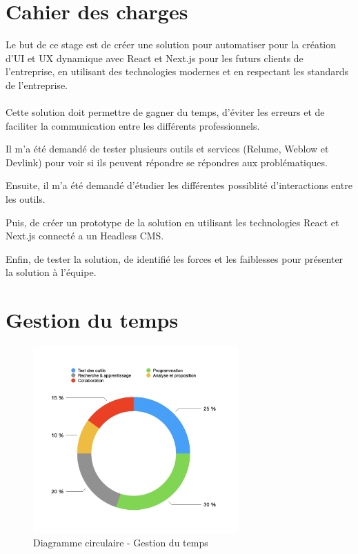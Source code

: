 \section{Cahier des charges}
Le but de ce stage est de créer une solution pour automatiser pour la création d'UI et UX dynamique avec React et Next.js pour les futurs clients de l'entreprise, en utilisant des technologies modernes et en respectant les standards de l'entreprise. 
\\ \\
Cette solution doit permettre de gagner du temps, d'éviter les erreurs et de faciliter la communication entre les différents professionnels.

Il m'a été demandé de tester plusieurs outils et services (Relume, Weblow et Devlink) pour voir si ils peuvent répondre se répondres aux problématiques.

Ensuite, il m'a été demandé d'étudier les différentes possiblité d'interactions entre les outils. 

Puis, de créer un prototype de la solution en utilisant les technologies React et Next.js connecté a un Headless CMS.

Enfin, de tester la solution, de identifié les forces et les faiblesses pour présenter la solution à l'équipe.

\section{Gestion du temps}

\begin{figure}[h] 
    \centering
    \includegraphics[width=0.7\textwidth]{Includes/Images/gestionTemps.png}
    \caption{Diagramme circulaire - Gestion du temps}
    \label{fig:Diagramme circulaire - Gestion du temps}
\end{figure}  

